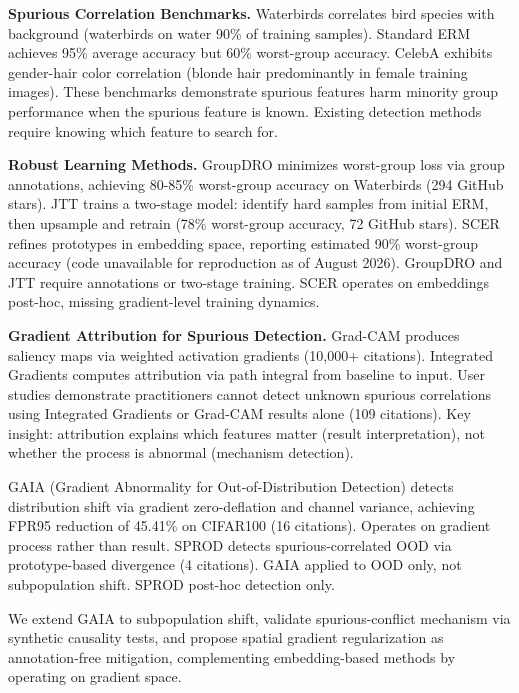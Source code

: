 
\textbf{Spurious Correlation Benchmarks.} Waterbirds correlates bird species with background (waterbirds on water 90\% of training samples). Standard ERM achieves 95\% average accuracy but 60\% worst-group accuracy. CelebA exhibits gender-hair color correlation (blonde hair predominantly in female training images). These benchmarks demonstrate spurious features harm minority group performance when the spurious feature is known. Existing detection methods require knowing which feature to search for.

\textbf{Robust Learning Methods.} GroupDRO minimizes worst-group loss via group annotations, achieving 80-85\% worst-group accuracy on Waterbirds (294 GitHub stars). JTT trains a two-stage model: identify hard samples from initial ERM, then upsample and retrain (78\% worst-group accuracy, 72 GitHub stars). SCER refines prototypes in embedding space, reporting estimated 90\% worst-group accuracy (code unavailable for reproduction as of August 2026). GroupDRO and JTT require annotations or two-stage training. SCER operates on embeddings post-hoc, missing gradient-level training dynamics.

\textbf{Gradient Attribution for Spurious Detection.} Grad-CAM produces saliency maps via weighted activation gradients (10,000+ citations). Integrated Gradients computes attribution via path integral from baseline to input. User studies demonstrate practitioners cannot detect unknown spurious correlations using Integrated Gradients or Grad-CAM results alone (109 citations). Key insight: attribution explains which features matter (result interpretation), not whether the process is abnormal (mechanism detection).

GAIA (Gradient Abnormality for Out-of-Distribution Detection) detects distribution shift via gradient zero-deflation and channel variance, achieving FPR95 reduction of 45.41\% on CIFAR100 (16 citations). Operates on gradient process rather than result. SPROD detects spurious-correlated OOD via prototype-based divergence (4 citations). GAIA applied to OOD only, not subpopulation shift. SPROD post-hoc detection only.

We extend GAIA to subpopulation shift, validate spurious-conflict mechanism via synthetic causality tests, and propose spatial gradient regularization as annotation-free mitigation, complementing embedding-based methods by operating on gradient space.
